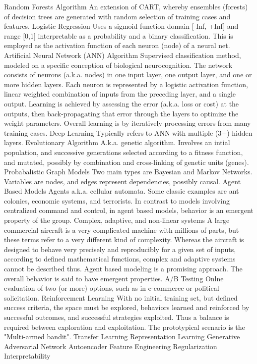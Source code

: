 \begin{appendices}
Random Forests Algorithm	An extension of CART, whereby ensembles (forests) of decision trees are generated with random selection of training cases and features.
Logistic Regression	Uses a sigmoid function domain [-Inf, +Inf] and range [0,1] interpretable as a probability and a binary classification.  This is employed as the activation function of each neuron (node) of a neural net.
Artificial Neural Network (ANN) Algorithm	Supervised classification method, modeled on a specific conception of biological neurocognition.  The network consists of neurons (a.k.a. nodes) in  one input layer, one output layer, and one or more hidden layers.  Each neuron is represented by a logistic activation function, linear weighted combination of inputs from the preceding layer, and a single output.  Learning is achieved by assessing the error (a.k.a. loss or cost) at the outputs, then back-propagating that error through the layers to optimize the weight parameters.  Overall learning is by iteratively processing errors from many training cases.
Deep Learning	Typically refers to ANN with multiple (3+) hidden layers.
Evolutionary Algorithm	A.k.a. genetic algorithm.  Involves an intial population, and successive generations selected according to a fitness function, and mutated, possibly by combination and cross-linking of genetic units (genes).
Probabalistic Graph Models	Two main types are Bayesian and Markov Networks.  Variables are nodes, and edges represent dependencies, possibly causal.
Agent Based Models	Agents a.k.a. cellular automata.  Some classic examples are ant colonies, economic systems, and terrorists.  In contrast to models involving centralized command and control, in agent based models, behavior is an emergent property of the group.
Complex, adaptive, and non-linear systems	A large commercial aircraft is a very complicated machine with millions of parts, but these terms refer to a very different kind of complexity.  Whereas the aircraft is designed to behave very precisely and reproducibly for a given set of inputs, according to defined mathematical functions, complex and adaptive systems cannot be described thus.  Agent based modeling is a promising approach.  The overall behavior is said to have emergent properties.
A/B Testing	Onlne evaluation of two (or more) options, such as in e-commerce or political solicitation.
Reinforcement Learning	With no initial training set, but defined success criteria, the space must be explored, behaviors learned and reinforced by successful outcomes, and successful strategies exploited.   Thus a balance is required between exploration and exploitation.  The prototypical scenario is the "Multi-armed bandit". 
Transfer Learning	
Representation Learning	
Generative Adversarial Network	
Autoencoder	
Feature Engineering	
Regularization	
Interpretability	



\end{appendices}